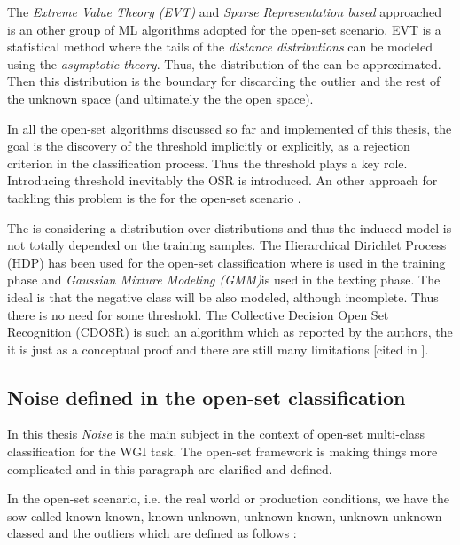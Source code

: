 The \textit{Extreme Value Theory (EVT)} and \textit{Sparse Representation based} approached is an other group of ML algorithms adopted for the open-set scenario. EVT is a statistical method where the tails of the \textit{distance distributions} can be modeled using the \textit{asymptotic theory}. Thus, the distribution of the  can be approximated. Then this distribution is the boundary for discarding the outlier and the rest of the unknown space (and ultimately the the open space).

In all the open-set algorithms discussed so far and implemented of this thesis, the goal is the discovery of the threshold implicitly or explicitly, as a rejection criterion in the classification process. Thus the threshold plays a key role. Introducing threshold inevitably the OSR is introduced. An other approach for tackling this problem is the  for the open-set scenario \parencite{geng2018recent}.

The  is considering a distribution over distributions and thus the induced model is not totally depended on the training samples. The Hierarchical Dirichlet Process (HDP) has been used for the open-set classification where  is used in the training phase and \textit{Gaussian Mixture Modeling (GMM)}is used in the texting phase. The ideal is that the negative class will be also modeled, although incomplete. Thus there is no need for some threshold. The Collective Decision Open Set Recognition (CDOSR) is such an algorithm which as reported by the authors, the it is just as a conceptual proof and there are still many limitations \parencite{geng2018collective}[cited in \parencite{geng2018recent}].


\subsection{Noise defined in the open-set classification}

In this thesis \textit{Noise} is the main subject in the context of open-set multi-class classification for the WGI task. The open-set framework is making things more complicated and in this paragraph are clarified and defined. 

In the open-set scenario, i.e. the real world or production conditions, we have the sow called known-known, known-unknown, unknown-known, unknown-unknown classed and the outliers  which are defined as follows \parencite{geng2018recent}:

